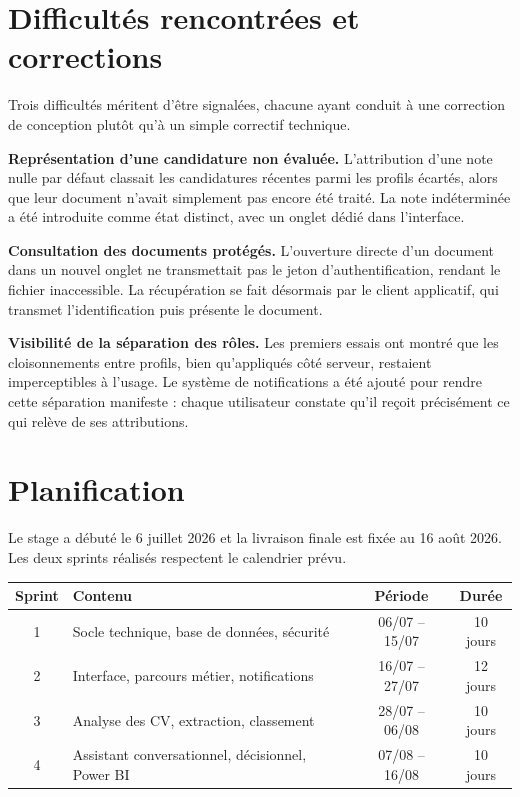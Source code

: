 \documentclass[11pt,a4paper]{article}
\begin{document}
\section{Difficultés rencontrées et corrections}
Trois difficultés méritent d'être signalées, chacune ayant conduit à une correction de conception plutôt qu'à un simple correctif technique.

\textbf{Représentation d'une candidature non évaluée.} L'attribution d'une note nulle par défaut classait les candidatures récentes parmi les profils écartés, alors que leur document n'avait simplement pas encore été traité. La note indéterminée a été introduite comme état distinct, avec un onglet dédié dans l'interface.

\textbf{Consultation des documents protégés.} L'ouverture directe d'un document dans un nouvel onglet ne transmettait pas le jeton d'authentification, rendant le fichier inaccessible. La récupération se fait désormais par le client applicatif, qui transmet l'identification puis présente le document.

\textbf{Visibilité de la séparation des rôles.} Les premiers essais ont montré que les cloisonnements entre profils, bien qu'appliqués côté serveur, restaient imperceptibles à l'usage. Le système de notifications a été ajouté pour rendre cette séparation manifeste : chaque utilisateur constate qu'il reçoit précisément ce qui relève de ses attributions.

\section{Planification}
Le stage a débuté le 6 juillet 2026 et la livraison finale est fixée au 16 août 2026. Les deux sprints réalisés respectent le calendrier prévu.

\begin{center}
\begin{tabular}{clcc}
  \toprule
  \textbf{Sprint} & \textbf{Contenu} & \textbf{Période} & \textbf{Durée} \\
  \midrule
  1 & Socle technique, base de données, sécurité & 06/07 -- 15/07 & 10 jours \\
  2 & Interface, parcours métier, notifications & 16/07 -- 27/07 & 12 jours \\
  3 & Analyse des CV, extraction, classement & 28/07 -- 06/08 & 10 jours \\
  4 & Assistant conversationnel, décisionnel, Power BI & 07/08 -- 16/08 & 10 jours \\
  \bottomrule
\end{tabular}
\end{center}
\end{document}
